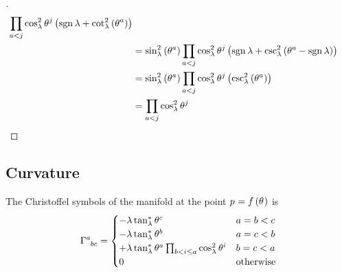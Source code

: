 \documentclass[../main.tex]{subfiles}
\begin{document}
\begin{proof}[]
\begin{align*}
\prod_{a<j}{\cos_\lambda^2\tensor{\theta}{^j}}
\left(
\sign{\lambda}
+\cot_\lambda^2\left(\tensor{\theta}{^a}
\right)
\right)\\
&=
\sin_\lambda^2\left(\tensor{\theta}{^a}\right)
\prod_{a<j}{\cos_\lambda^2\tensor{\theta}{^j}}
\left(
\sign{\lambda}
+\csc_\lambda^2\left(\tensor{\theta}{^a}
-\sign{\lambda}
\right)
\right)\\
&=
\sin_\lambda^2\left(\tensor{\theta}{^a}\right)
\prod_{a<j}{\cos_\lambda^2\tensor{\theta}{^j}}
\left(
\csc_\lambda^2\left(\tensor{\theta}{^a}
\right)
\right)\\
&=
\prod_{a<j}{\cos_\lambda^2\tensor{\theta}{^j}}
\end{align*}
\end{proof}
\subsection{Curvature}
\begin{lemma}\label{M:Christoffel}
The Christoffel symbols of the manifold
at the point $\tensor{p}{}=f\left(\tensor{\theta}{}\right)$
is
\begin{equation*}
\tensor{\Gamma}{^a_b_c}=\begin{cases}
-\lambda\tan_\lambda^\ast\tensor{\theta}{^c}&\text{$a=b<c$}\\
-\lambda\tan_\lambda^\ast\tensor{\theta}{^b}&\text{$a=c<b$}\\
+\lambda\tan_\lambda^\ast\tensor{\theta}{^a}\prod_{b<i\le a}{\cos_\lambda^2\tensor{\theta}{^i}}&\text{$b=c<a$}\\
0&\text{otherwise}\\
\end{cases}
\end{equation*}
\end{lemma}
\end{document}

